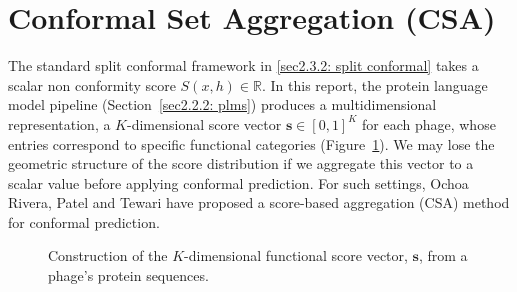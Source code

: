 \section{Conformal Set Aggregation (CSA)}
\label{sec2.4: CSA Method}
The standard split conformal framework in \ref{sec2.3.2: split conformal} takes a scalar non conformity 
score $S(x, h) \in \mathbb{R}$. In this report, the protein language model pipeline (Section~\ref{sec2.2.2: plms}) produces a multidimensional representation, a 
$K$-dimensional score vector $\mathbf{s} \in [0, 1]^K$ for each phage, whose entries correspond to specific 
functional categories (Figure~\ref{fig: score vector scheme}). We may lose the 
geometric structure of the score distribution if we aggregate this vector to a scalar value before applying 
conformal prediction. For such settings, Ochoa Rivera, Patel and Tewari \cite{ochoarivera2024conformal} 
have proposed a score-based aggregation (CSA) method for conformal prediction.


\begin{figure}[htbp]
\centering
{}
\caption{Construction of the $K$-dimensional functional score vector, $\mathbf{s}$, from a phage's protein sequences.}
\label{fig: score vector scheme}
\end{figure}

